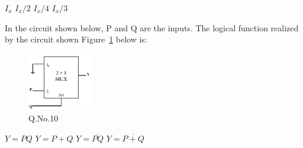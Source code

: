 \documentclass[a4, 12pt, addpoints]{exam}
\begin{document}
\begin{questions}
\begin{oneparchoices}
    \choice $I_x$
    \choice $I_x/2$
    \CorrectChoice $I_x/4$
    \choice $I_x/3$
\end{oneparchoices}

\question In the circuit shown below, P and Q are the inputs. The logical function realized by the circuit shown Figure~\ref{fig:2} below is:
\begin{figure}[H]
\centering
\includegraphics[width=0.25\textwidth]{mux}
\caption{Q.No.10}
\label{fig:2}
\end{figure}
\begin{oneparchoices}
    \choice $Y = PQ$
    \choice $Y=P+Q$
    \choice $Y = \overline{PQ}$
    \CorrectChoice $Y= \overline{P + Q}$
    
\end{oneparchoices}



\vspace{0.10in}

\end{questions}
\end{document}
